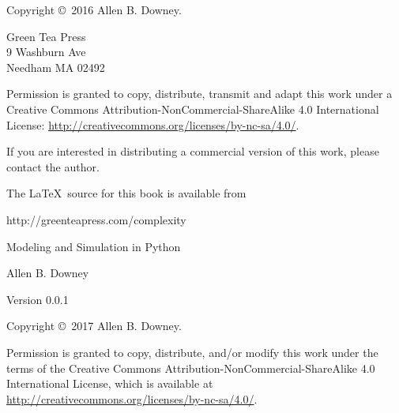 \documentclass[12pt]{book}
\newcommand{\thetitle}{Modeling and Simulation in Python}
\newcommand{\theauthors}{Allen B. Downey}
\newcommand{\theversion}{0.0.1}
\theoremstyle{exercise}
\begin{document}
\begin{latexonly}
\begin{flushright}
\end{flushright}


\pagebreak
\thispagestyle{empty}

Copyright \copyright ~2016 \theauthors.



\vspace{0.2in}

\begin{flushleft}
Green Tea Press       \\
9 Washburn Ave \\
Needham MA 02492
\end{flushleft}

Permission is granted to copy, distribute, transmit and adapt this work under a Creative Commons Attribution-NonCommercial-ShareAlike 4.0 International License: \url{http://creativecommons.org/licenses/by-nc-sa/4.0/}.

If you are interested in distributing a commercial version of this
work, please contact the author.

The \LaTeX\ source for this book is available from

\begin{code}
      http://greenteapress.com/complexity
\end{code}


\cleardoublepage
\setcounter{tocdepth}{1}
\tableofcontents

\end{latexonly}



\begin{htmlonly}

\vspace{1em}

{\Large \thetitle}

{\large \theauthors}

Version \theversion

\vspace{1em}

Copyright \copyright ~2017 \theauthors.

Permission is granted to copy, distribute, and/or modify this work
under the terms of the Creative Commons
Attribution-NonCommercial-ShareAlike 4.0 International License, which is
available at \url{http://creativecommons.org/licenses/by-nc-sa/4.0/}.

\vspace{1em}

\setcounter{chapter}{-1}

\end{htmlonly}
\end{document}
